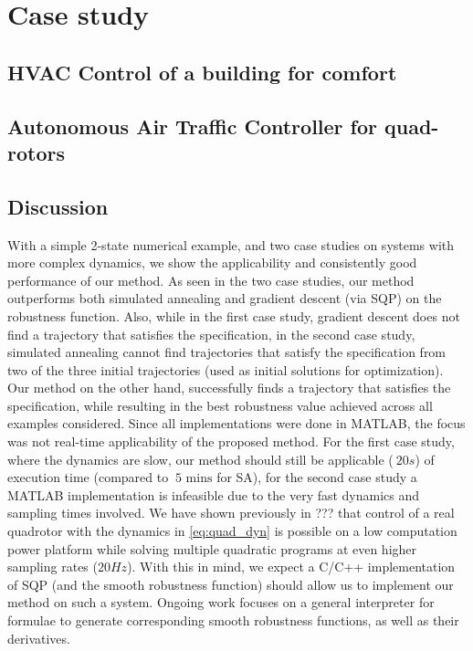 \section{Case study}
\label{sec:case study}


\subsection{HVAC Control of a building for comfort}



\subsection{Autonomous Air Traffic Controller for quad-rotors}


\subsection{Discussion}
With a simple 2-state numerical example, and two case studies on systems with more complex dynamics, we show the applicability and consistently good performance of our method. As seen in the two case studies, our method outperforms both simulated annealing and gradient descent (via SQP) on the robustness function. Also, while in the first case study, gradient descent does not find a trajectory that satisfies the specification, in the second case study, simulated annealing cannot find trajectories that satisfy the specification from two of the three initial trajectories (used as initial solutions for optimization). Our method on the other hand, successfully finds a trajectory that satisfies the specification, while resulting in the best robustness value achieved across all examples considered. 
Since all implementations were done in MATLAB, the focus was not real-time applicability of the proposed method. For the first case study, where the dynamics are slow, our method should still be applicable ($~20s$) of execution time (compared to $~5 \text{ mins}$ for SA), for the second case study a MATLAB implementation is infeasible due to the very fast dynamics and sampling times involved. We have shown previously in ??? that control of a real quadrotor with the dynamics in \eqref{eq:quad_dyn} is possible on a low computation power platform while solving multiple quadratic programs at even higher sampling rates ($20Hz$). With this in mind, we expect a C/C++ implementation of SQP (and the smooth robustness function) should allow us to implement our method on such a system. Ongoing work focuses on a general interpreter for formulae to generate corresponding smooth robustness functions, as well as their derivatives.